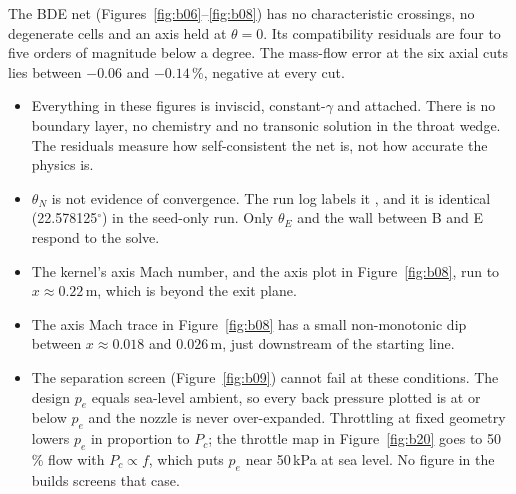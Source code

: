 The BDE net (Figures~\ref{fig:b06}--\ref{fig:b08}) has no characteristic crossings, no degenerate cells and an axis held at $\theta = 0$. Its compatibility residuals are four to five orders of magnitude below a degree. The mass-flow error at the six axial cuts lies between $-0.06$ and $-0.14$\,\%, negative at every cut.

\begin{itemize}
\item Everything in these figures is inviscid, constant-$\gamma$ and attached. There is no boundary layer, no chemistry and no transonic solution in the throat wedge. The residuals measure how self-consistent the net is, not how accurate the physics is.
\item $\theta_N$ is not evidence of convergence. The run log labels it , and it is identical (22.578125$^\circ$) in the seed-only  run. Only $\theta_E$ and the wall between B and E respond to the solve.
\item The kernel's axis Mach number, and the axis plot in Figure~\ref{fig:b08}, run to $x \approx 0.22$\,m, which is beyond the exit plane.
\item The axis Mach trace in Figure~\ref{fig:b08} has a small non-monotonic dip between $x \approx 0.018$ and $0.026$\,m, just downstream of the starting line.
\item The separation screen (Figure~\ref{fig:b09}) cannot fail at these conditions. The design $p_e$ equals sea-level ambient, so every back pressure plotted is at or below $p_e$ and the nozzle is never over-expanded. Throttling at fixed geometry lowers $p_e$ in proportion to $P_c$; the throttle map in Figure~\ref{fig:b20} goes to 50\,\% flow with $P_c \propto f$, which puts $p_e$ near 50\,kPa at sea level. No figure in the builds screens that case.
\end{itemize}



